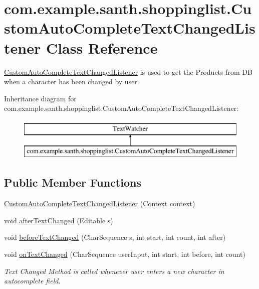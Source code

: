\hypertarget{classcom_1_1example_1_1santh_1_1shoppinglist_1_1_custom_auto_complete_text_changed_listener}{}\section{com.\+example.\+santh.\+shoppinglist.\+Custom\+Auto\+Complete\+Text\+Changed\+Listener Class Reference}
\label{classcom_1_1example_1_1santh_1_1shoppinglist_1_1_custom_auto_complete_text_changed_listener}


\hyperlink{classcom_1_1example_1_1santh_1_1shoppinglist_1_1_custom_auto_complete_text_changed_listener}{Custom\+Auto\+Complete\+Text\+Changed\+Listener} is used to get the Products from DB when a character has been changed by user.  


Inheritance diagram for com.\+example.\+santh.\+shoppinglist.\+Custom\+Auto\+Complete\+Text\+Changed\+Listener\+:\begin{figure}[H]
\begin{center}
\leavevmode
\includegraphics[height=2.000000cm]{classcom_1_1example_1_1santh_1_1shoppinglist_1_1_custom_auto_complete_text_changed_listener}
\end{center}
\end{figure}
\subsection*{Public Member Functions}
\begin{DoxyCompactItemize}
\item 
\hyperlink{classcom_1_1example_1_1santh_1_1shoppinglist_1_1_custom_auto_complete_text_changed_listener_a7bfd44ba7bf1c8efc03affa0141c47d6}{Custom\+Auto\+Complete\+Text\+Changed\+Listener} (Context context)
\item 
void \hyperlink{classcom_1_1example_1_1santh_1_1shoppinglist_1_1_custom_auto_complete_text_changed_listener_aa989a3cebf9d00d6890109bc4af95b4a}{after\+Text\+Changed} (Editable s)
\item 
void \hyperlink{classcom_1_1example_1_1santh_1_1shoppinglist_1_1_custom_auto_complete_text_changed_listener_a21edbf3f7a843071c09e56a99d382f35}{before\+Text\+Changed} (Char\+Sequence s, int start, int count, int after)
\item 
void \hyperlink{classcom_1_1example_1_1santh_1_1shoppinglist_1_1_custom_auto_complete_text_changed_listener_a273187b7db0bec83b92ec9a9b81e6794}{on\+Text\+Changed} (Char\+Sequence user\+Input, int start, int before, int count)
\begin{DoxyCompactList}\small\item\em Text Changed Method is called whenever user enters a new character in autocomplete field. \end{DoxyCompactList}\end{DoxyCompactItemize}
